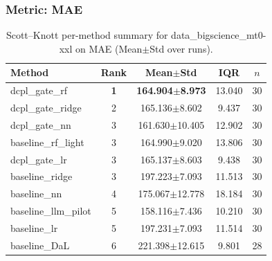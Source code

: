 \subsubsection*{Metric: MAE}
\begin{table}[H]
\centering
\scriptsize
\setlength{\tabcolsep}{4pt}
\renewcommand{\arraystretch}{1.1}
\caption{Scott--Knott per-method summary for data\_bigscience\_mt0-xxl on MAE (Mean$\pm$Std over runs).}
\label{tab:sk_data_bigscience_mt0-xxl_MAE}
\begin{tabular}{l|c|c|c|c}
\hline
\textbf{Method} & \textbf{Rank} & \textbf{Mean$\pm$Std} & \textbf{IQR} & \textbf{$n$} \\
\hline
\rowcolor{red!15} dcpl\_gate\_rf & \textbf{1} & \textbf{164.904$\pm$8.973} & 13.040 & 30 \\
dcpl\_gate\_ridge & 2 & 165.136$\pm$8.602 & 9.437 & 30 \\
dcpl\_gate\_nn & 3 & 161.630$\pm$10.405 & 12.902 & 30 \\
baseline\_rf\_light & 3 & 164.990$\pm$9.020 & 13.806 & 30 \\
dcpl\_gate\_lr & 3 & 165.137$\pm$8.603 & 9.438 & 30 \\
baseline\_ridge & 3 & 197.223$\pm$7.093 & 11.513 & 30 \\
baseline\_nn & 4 & 175.067$\pm$12.778 & 18.184 & 30 \\
baseline\_llm\_pilot & 5 & 158.116$\pm$7.436 & 10.210 & 30 \\
baseline\_lr & 5 & 197.231$\pm$7.093 & 11.514 & 30 \\
baseline\_DaL & 6 & 221.398$\pm$12.615 & 9.801 & 28 \\
\hline
\end{tabular}
\end{table}

